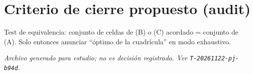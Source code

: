 \documentclass[11pt,a4paper]{article}
\begin{document}
\section{Criterio de cierre propuesto (audit)}
Test de equivalencia: conjunto de celdas de (B) o (C) acordado = conjunto de (A).
Solo entonces anunciar ``óptimo de la cuadrícula'' en modo exhaustivo.

\vspace{0.8em}
\noindent\textit{Archivo generado para estudio; no es decisión registrada. Ver \texttt{T-20261122-pj-b94d}.}
\end{document}
